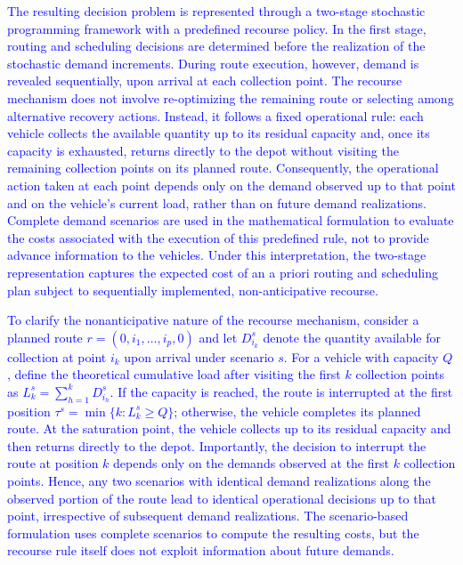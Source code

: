 \documentclass[authoryear,preprint,12pt]{elsarticle}
\newcommand{\rev}[1]{\textcolor{blue}{{#1}}}
\begin{document}
\rev{The resulting decision problem is represented through a two-stage stochastic programming framework with a predefined recourse policy. In the first stage, routing and scheduling decisions are determined before the realization of the stochastic demand increments. During route execution, however, demand is revealed sequentially, upon arrival at each collection point. The recourse mechanism does not involve re-optimizing the remaining route or selecting among alternative recovery actions. Instead, it follows a fixed operational rule: each vehicle collects the available quantity up to its residual capacity and, once its capacity is exhausted, returns directly to the depot without visiting the remaining collection points on its planned route. Consequently, the operational action taken at each point depends only on the demand observed up to that point and on the vehicle's current load, rather than on future demand realizations. Complete demand scenarios are used in the mathematical formulation to evaluate the costs associated with the execution of this predefined rule, not to provide advance information to the vehicles. Under this interpretation, the two-stage representation captures the expected cost of an a priori routing and scheduling plan subject to sequentially implemented, non-anticipative recourse.}


\rev{To clarify the nonanticipative nature of the recourse mechanism, consider a planned route $r=(0,i_1,\ldots,i_p,0)$ and let $D_{i_k}^s$ denote the quantity available for collection at point $i_k$ upon arrival under scenario $s$. For a vehicle with capacity $Q$, define the theoretical cumulative load after visiting the first $k$ collection points as $L_k^s=\sum_{h=1}^{k}D_{i_h}^s$. If the capacity is reached, the route is interrupted at the first position $\tau^s=\min\{k:L_k^s\geq Q\}$; otherwise, the vehicle completes its planned route. At the saturation point, the vehicle collects up to its residual capacity and then returns directly to the depot. Importantly, the decision to interrupt the route at position $k$ depends only on the demands observed at the first $k$ collection points. Hence, any two scenarios with identical demand realizations along the observed portion of the route lead to identical operational decisions up to that point, irrespective of subsequent demand realizations. The scenario-based formulation uses complete scenarios to compute the resulting costs, but the recourse rule itself does not exploit information about future demands.}
\end{document}
